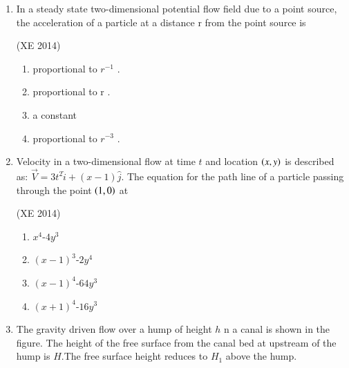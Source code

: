 \documentclass[journal,12pt,onecolumn]{IEEEtran}
\theoremstyle{remark}
\begin{document}
\begin{enumerate}
\item In a steady state two-dimensional potential flow field due to a point source, the acceleration of a
particle at a distance r from the point source is

\hfill{(XE 2014)}
\begin{multicols}{4}
\begin{enumerate}

\item proportional to $r^{-1}$ .
\item proportional to r .
\item a constant
\item proportional to $r^{-3}$ .

\end{enumerate}
\end{multicols}


\item Velocity in a two-dimensional flow at time $t$ and location $\left(x,y\right)$ is described as:
$\vec{V}=3t^{2}\hat{i}+(x-1)\hat{j}$. The equation for the path line of a particle passing through the point $\left(1,0\right)$ at

\hfill{(XE 2014)}
\begin{multicols}{4}
\begin{enumerate}

\item $x^{4}$-$4y^{3}$
\item $(x-1)^{3}$-$2y^{4}$
\item $(x-1)^{4}$-$64y^{3}$
\item $(x+1)^{4}$-$16y^{3}$

\end{enumerate}
\end{multicols}



\item The gravity driven flow over a hump of height $h$ n a canal is shown in the figure. The height of
the free surface from the canal bed at upstream of the hump is $H$.The free surface height reduces
to $H_1$ above the hump.


\end{enumerate}
\end{document}

